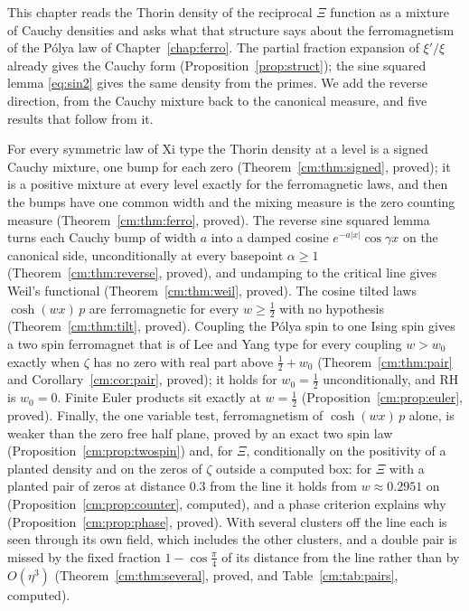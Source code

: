 
This chapter reads the Thorin density of the reciprocal $\Xi$ function as a mixture of Cauchy densities and asks what that structure says about the ferromagnetism of the P\'olya law of Chapter~\ref{chap:ferro}. The partial fraction expansion of $\xi'/\xi$ already gives the Cauchy form (Proposition~\ref{prop:struct}); the sine squared lemma \eqref{eq:sin2} gives the same density from the primes. We add the reverse direction, from the Cauchy mixture back to the canonical measure, and five results that follow from it.

For every symmetric law of Xi type the Thorin density at a level is a signed Cauchy mixture, one bump for each zero (Theorem~\ref{cm:thm:signed}, proved); it is a positive mixture at every level exactly for the ferromagnetic laws, and then the bumps have one common width and the mixing measure is the zero counting measure (Theorem~\ref{cm:thm:ferro}, proved). The reverse sine squared lemma turns each Cauchy bump of width $a$ into a damped cosine $e^{-a|x|}\cos\gamma x$ on the canonical side, unconditionally at every basepoint $\alpha\ge1$ (Theorem~\ref{cm:thm:reverse}, proved), and undamping to the critical line gives Weil's functional (Theorem~\ref{cm:thm:weil}, proved). The cosine tilted laws $\cosh(wx)\,p$ are ferromagnetic for every $w\ge\frac12$ with no hypothesis (Theorem~\ref{cm:thm:tilt}, proved). Coupling the P\'olya spin to one Ising spin gives a two spin ferromagnet that is of Lee and Yang type for every coupling $w>w_0$ exactly when $\zeta$ has no zero with real part above $\frac12+w_0$ (Theorem~\ref{cm:thm:pair} and Corollary~\ref{cm:cor:pair}, proved); it holds for $w_0=\frac12$ unconditionally, and RH is $w_0=0$. Finite Euler products sit exactly at $w=\frac12$ (Proposition~\ref{cm:prop:euler}, proved). Finally, the one variable test, ferromagnetism of $\cosh(wx)\,p$ alone, is weaker than the zero free half plane, proved by an exact two spin law (Proposition~\ref{cm:prop:twospin}) and, for $\Xi$, conditionally on the positivity of a planted density and on the zeros of $\zeta$ outside a computed box: for $\Xi$ with a planted pair of zeros at distance $0.3$ from the line it holds from $w\approx0.2951$ on (Proposition~\ref{cm:prop:counter}, computed), and a phase criterion explains why (Proposition~\ref{cm:prop:phase}, proved). With several clusters off the line each is seen through its own field, which includes the other clusters, and a double pair is missed by the fixed fraction $1-\cos\frac\pi4$ of its distance from the line rather than by $O(\eta^3)$ (Theorem~\ref{cm:thm:several}, proved, and Table~\ref{cm:tab:pairs}, computed).

